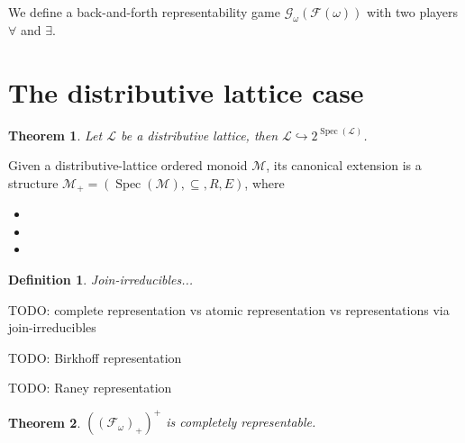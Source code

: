 \documentclass[a4paper]{article}
\theoremstyle{defin}
\newtheorem{definition}{Definition}
\theoremstyle{theorem}
\newtheorem{theorem}{Theorem}
\theoremstyle{claim}
\theoremstyle{prop}
\theoremstyle{lemma}
\theoremstyle{fact}
\theoremstyle{ex}
\theoremstyle{col}
\begin{document}
We define a back-and-forth representability game $\mathcal{G}_{\omega}(\mathcal{F}(\omega))$ with two players $\forall$ and $\exists$.

\section{The distributive lattice case}

\begin{theorem}
Let $\mathcal{L}$ be a distributive lattice, then $\mathcal{L} \hookrightarrow 2^{\operatorname{Spec}(\mathcal{L})}$.
\end{theorem}


Given a distributive-lattice ordered monoid $\mathcal{M}$, its canonical extension is a structure $\mathcal{M}_{+} = (\operatorname{Spec}(\mathcal{M}), \subseteq, R, E)$, where
\begin{itemize}
\item
\item
\item
\end{itemize}

\begin{definition}
Join-irreducibles...
\end{definition}

TODO: complete representation vs atomic representation vs representations via join-irreducibles

TODO: Birkhoff representation

TODO: Raney representation

\begin{theorem}
$((\mathcal{F}_{\omega})_+)^+$ is completely representable.
\end{theorem}



\end{document}
